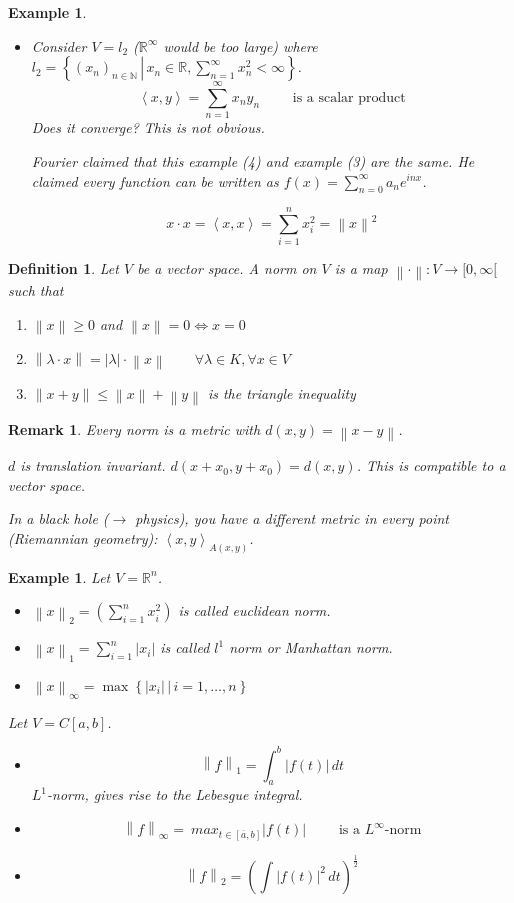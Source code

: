 \documentclass{article}
\newcounter{lecref}[section]
\numberwithin{lecref}{section}
\newtheorem{example}[lecref]{Example}
\newtheorem{definition}[lecref]{Definition}
\newtheorem{remark}[lecref]{Remark}
\newcommand{\setdef}[2]{\left\{\left.#1\,\right|\,#2\right\}}
\newcommand{\angel}[1]{\left\langle#1\right\rangle}
\newcommand{\norm}[1]{\left\|#1\right\|}
\newcommand{\card}[1]{\left|#1\right|}
\begin{document}
\begin{example}
\begin{itemize}
    \item
      Consider $V = l_2$ ($\mathbb R^{\infty}$ would be too large) where $l_2 = \setdef{(x_n)_{n\in\mathbb N}}{x_n \in \mathbb R, \sum_{n=1}^\infty x_n^2 < \infty}$.
      \[ \angel{x, y} = \sum_{n=1}^\infty x_n y_n \qquad \text{ is a scalar product} \]
      Does it converge? This is not obvious.

      Fourier claimed that this example (4) and example (3) are the same.
      He claimed every function can be written as $f(x) = \sum_{n=0}^\infty a_n e^{inx}$.

      \[ x \cdot x = \angel{x, x} = \sum_{i=1}^n x_i^2 = \norm{x}^2 \]
  \end{itemize}
\end{example}

\begin{definition}
  Let $V$ be a vector space.
  A \emph{norm} on $V$ is a map $\norm{\cdot}: V \to [0,\infty[$
  such that
  \begin{enumerate}
    \item $\norm{x} \geq 0$ and $\norm{x} = 0 \iff x = 0$
    \item $\norm{\lambda \cdot x} = \card{\lambda} \cdot \norm{x} \qquad \forall \lambda \in K, \forall x \in V$
    \item $\norm{x + y} \leq \norm{x} + \norm{y}$ is the triangle inequality
  \end{enumerate}
\end{definition}

\begin{remark}
  Every norm is a metric with $d(x,y) = \norm{x - y}$.

  $d$ is translation invariant. $d(x + x_0, y + x_0) = d(x, y)$.
  This is compatible to a vector space.

  In a black hole ($\to$ physics), you have a different metric in every point (Riemannian geometry): $\angel{x,y}_{A(x,y)}$.
\end{remark}

\begin{example}
  Let $V = \mathbb R^n$.
  \begin{itemize}
    \item $\norm{x}_2 = \left(\sum_{i=1}^n x_i^2\right)$ is called \emph{euclidean norm}.
    \item $\norm{x}_1 = \sum_{i=1}^n \card{x_i}$ is called \emph{$l^1$ norm} or \emph{Manhattan norm}.
    \item $\norm{x}_{\infty} = \max\setdef{\card{x_i}}{i = 1, \dots, n}$
  \end{itemize}
  Let $V = C[a,b]$.
  \begin{itemize}
    \item \[ \norm{f}_1 = \int_a^b \card{f(t)} \, dt \]
      $L^1$-norm, gives rise to the Lebesgue integral.
    \item \[ \norm{f}_\infty =\ max_{t \in [\overline{a}, b]} \card{f(t)} \qquad \text{ is a $L^\infty$-norm} \]
    \item \[ \norm{f}_2 = \left(\int \card{f(t)}^2 \, dt \right)^{\frac12} \]
  \end{itemize}
\end{example}
\end{document}
